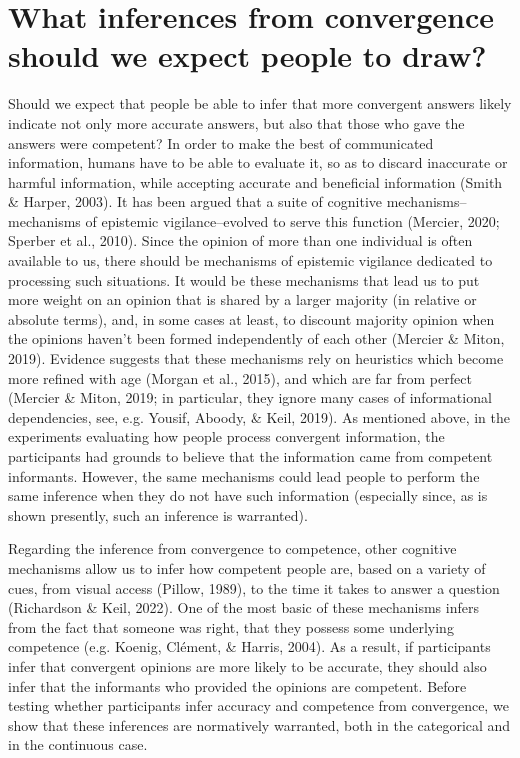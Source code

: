 \documentclass[
  doc,floatsintext]{apa6}
\begin{document}
\section{What inferences from convergence should we expect people to draw?}\label{what-inferences-from-convergence-should-we-expect-people-to-draw}

Should we expect that people be able to infer that more convergent answers likely indicate not only more accurate answers, but also that those who gave the answers were competent? In order to make the best of communicated information, humans have to be able to evaluate it, so as to discard inaccurate or harmful information, while accepting accurate and beneficial information (Smith \& Harper, 2003). It has been argued that a suite of cognitive mechanisms--mechanisms of epistemic vigilance--evolved to serve this function (Mercier, 2020; Sperber et al., 2010). Since the opinion of more than one individual is often available to us, there should be mechanisms of epistemic vigilance dedicated to processing such situations. It would be these mechanisms that lead us to put more weight on an opinion that is shared by a larger majority (in relative or absolute terms), and, in some cases at least, to discount majority opinion when the opinions haven't been formed independently of each other (Mercier \& Miton, 2019). Evidence suggests that these mechanisms rely on heuristics which become more refined with age (Morgan et al., 2015), and which are far from perfect (Mercier \& Miton, 2019; in particular, they ignore many cases of informational dependencies, see, e.g. Yousif, Aboody, \& Keil, 2019). As mentioned above, in the experiments evaluating how people process convergent information, the participants had grounds to believe that the information came from competent informants. However, the same mechanisms could lead people to perform the same inference when they do not have such information (especially since, as is shown presently, such an inference is warranted).

Regarding the inference from convergence to competence, other cognitive mechanisms allow us to infer how competent people are, based on a variety of cues, from visual access (Pillow, 1989), to the time it takes to answer a question (Richardson \& Keil, 2022). One of the most basic of these mechanisms infers from the fact that someone was right, that they possess some underlying competence (e.g. Koenig, Clément, \& Harris, 2004). As a result, if participants infer that convergent opinions are more likely to be accurate, they should also infer that the informants who provided the opinions are competent. Before testing whether participants infer accuracy and competence from convergence, we show that these inferences are normatively warranted, both in the categorical and in the continuous case.
\end{document}

